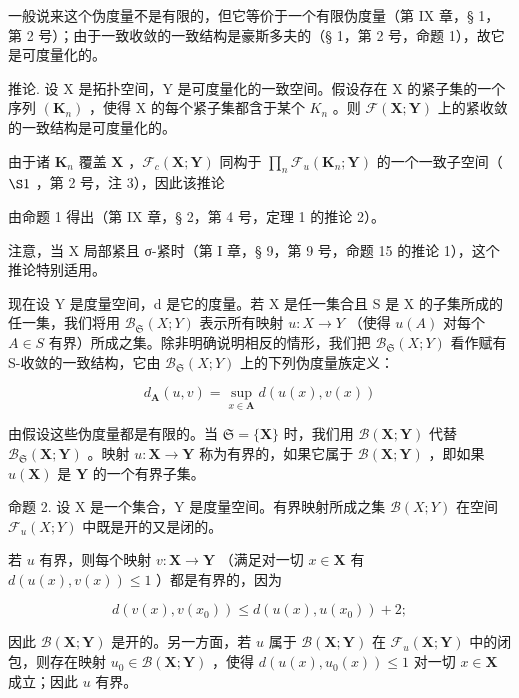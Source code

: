 一般说来这个伪度量不是有限的，但它等价于一个有限伪度量（第 IX 章，§ 1，第 2 号）；由于一致收敛的一致结构是豪斯多夫的（§ 1，第 2 号，命题 1），故它是可度量化的。

推论. 设 X 是拓扑空间，Y 是可度量化的一致空间。假设存在 X 的紧子集的一个序列 \((\mathbf{K}_{n})\) ，使得 X 的每个紧子集都含于某个 \(K_{n}\) 。则 \(\mathcal{F}(\mathbf{X};\mathbf{Y})\) 上的紧收敛的一致结构是可度量化的。

由于诸 \(\mathbf{K}_n\) 覆盖 \(\mathbf{X}\) ，\(\mathcal{F}_c(\mathbf{X};\mathbf{Y})\) 同构于 \(\prod_{n}\mathcal{F}_{u}(\mathbf{K}_{n};\mathbf{Y})\) 的一个一致子空间（ \(\S 1\) ，第 2 号，注 3），因此该推论

由命题 1 得出（第 IX 章，§ 2，第 4 号，定理 1 的推论 2）。

注意，当 X 局部紧且 σ-紧时（第 I 章，§ 9，第 9 号，命题 15 的推论 1），这个推论特别适用。

现在设 Y 是度量空间，d 是它的度量。若 X 是任一集合且 S 是 X 的子集所成的任一集，我们将用 \(\mathcal{B}_{\mathfrak{S}}(X;Y)\) 表示所有映射 \(u:X\to Y\) （使得 \(u(A)\) 对每个 \(A\in S\) 有界）所成之集。除非明确说明相反的情形，我们把 \(\mathcal{B}_{\mathfrak{S}}(X;Y)\) 看作赋有 S-收敛的一致结构，它由 \(\mathcal{B}_{\mathfrak{S}}(X;Y)\) 上的下列伪度量族定义：

\[
d _ {\mathbf {A}} (u, v) = \sup _ {x \in \mathbf {A}} d (u (x), v (x))\tag{A ∈ S}
\]

由假设这些伪度量都是有限的。当 \(\mathfrak{S} = \{\mathbf{X}\}\) 时，我们用 \(\mathcal{B}(\mathbf{X};\mathbf{Y})\) 代替 \(\mathcal{B}_{\mathfrak{S}}(\mathbf{X};\mathbf{Y})\) 。映射 \(u:\mathbf{X}\to \mathbf{Y}\) 称为有界的，如果它属于 \(\mathcal{B}(\mathbf{X};\mathbf{Y})\) ，即如果 \(u(\mathbf{X})\) 是 \(\mathbf{Y}\) 的一个有界子集。

命题 2. 设 X 是一个集合，Y 是度量空间。有界映射所成之集 \(\mathcal{B}(X;Y)\) 在空间 \(\mathcal{F}_{u}(X;Y)\) 中既是开的又是闭的。

若 \(u\) 有界，则每个映射 \(v: \mathbf{X} \to \mathbf{Y}\) （满足对一切 \(x \in \mathbf{X}\) 有 \(d(u(x), v(x)) \leqslant 1\) ）都是有界的，因为

\[
d (v (x), v (x _ {0})) \leqslant d (u (x), u (x _ {0})) + 2;
\]

因此 \(\mathcal{B}(\mathbf{X};\mathbf{Y})\) 是开的。另一方面，若 \(u\) 属于 \(\mathcal{B}(\mathbf{X};\mathbf{Y})\) 在 \(\mathcal{F}_u(\mathbf{X};\mathbf{Y})\) 中的闭包，则存在映射 \(u_0\in \mathcal{B}(\mathbf{X};\mathbf{Y})\) ，使得 \(d(u(x),u_0(x))\leqslant 1\) 对一切 \(x\in \mathbf{X}\) 成立；因此 \(u\) 有界。

